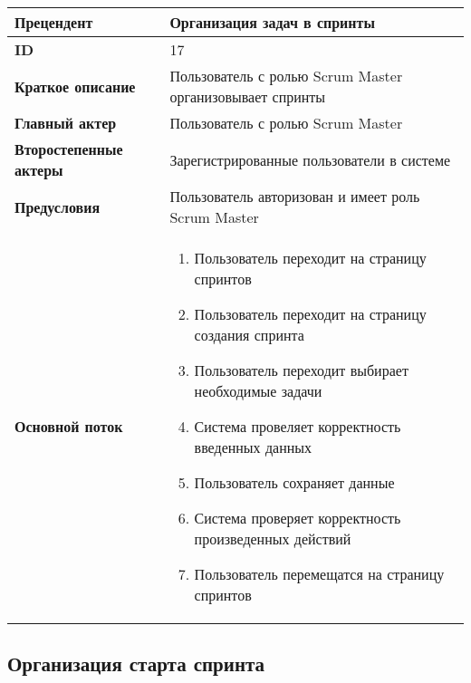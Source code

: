 \documentclass[14pt,a4paper]{extarticle}
\begin{document}
\begin{tabular}{|l|p{9cm}|}
	\hline
	\textbf{Прецендент}            & Организация задач в спринты                                                  \\
	\hline
	\textbf{ID}                    & 17                                                                           \\
	\hline
	\textbf{Краткое описание}      & Пользователь с ролью Scrum Master организовывает спринты              	      \\
	\hline
	\textbf{Главный актер}         & Пользователь с ролью Scrum Master                                            \\
	\hline
	\textbf{Второстепенные актеры} & Зарегистрированные пользователи в системе                                    \\
	\hline
	\textbf{Предусловия}           & Пользователь авторизован и имеет роль Scrum Master                           \\
	\hline
	\textbf{Основной поток}        & \begin{enumerate}
		                                 \item Пользователь переходит на страницу спринтов
		                                 \item Пользователь переходит на страницу создания спринта
						 \item Пользователь переходит выбирает необходимые задачи
						 \item Система провеляет корректность введенных данных
					         \item Пользователь сохраняет данные
		                                 \item Система проверяет корректность произведенных действий
						 \item Пользователь перемещатся на страницу спринтов
	                                 \end{enumerate} \\
	\hline
\end{tabular}

\subsection{Организация старта спринта}
\end{document}
